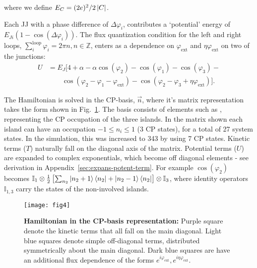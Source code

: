 \noindent where we define $ E_{C}={(2e)^{2}}/{2 \left|C\right| } $.

Each  JJ  with   a  phase  difference  of  $\Delta\varphi_{i}$,  contributes   a  `potential'  energy  of
$ E_{Ji}\left(1 - \cos(\Delta\varphi_i)\right) $.  The flux quantization condition for the left and right
loops,  $  \sum_{i}^{\text{loop}} \varphi_i  =  2\pi  n,  n \in  \mathbb{Z}$,  enters  as a  dependence  on
$ \varphi_\text{ext} $ and $ \eta\varphi_\text{ext} $ on two of the junctions:
\begin{equation}\label{eq:potential}
  \begin{aligned}
    U & = E_J\big[4 + \alpha - \alpha\cos(\varphi_{2}) -\cos(\varphi_{1}) -\cos(\varphi_{3}) - \\
    & \qquad \cos(\varphi_{2} - \varphi_{1} - \varphi_{\text{ext}}) - \cos(\varphi_{2} - \varphi_{3} + \eta\varphi_{\text{ext}})\big].
  \end{aligned}
\end{equation}

The Hamiltonian is solved in the CP-basis,  $\vec{n} $, where it's matrix representation takes
the form shown  in Fig.~\ref{fig:matrix_representation}.  The basis consists  of elements such
as , representing the CP occupation  of the three islands.  In the matrix shown
each island can have an  occupation $ -1 \le n_{i} \le 1$ (3 CP states),  for a total of 27 system
states. In  the simulation, this  was increased to  343 by using  7 CP states.   Kinetic terms
($ {T}  $) naturally fall on  the diagonal axis  of the matrix.   Potential terms ($ U  $) are
expanded  to complex  exponentials, which  become off  diagonal elements  - see  derivation in
Appendix~\ref{sec:expans-potent-term}.     For    example     $    \cos(\varphi_{2})    $    becomes
$    \mathbb{I}_{1}\otimes\frac{1}{2}\left[\sum_{n_2}\ket{n_2+1}\bra{n_2}     +    \ket{n_2-1}\bra{n_2}
\right]\otimes\mathbb{I}_{3} $,  where identity operators $  \mathbb{I}_{1,3} $ carry the  states of
the non-involved islands.

\begin{figure}[ht]
  \centering \texttt{[image: fig4]}
  \caption{\small \textbf{Hamiltonian in the CP-basis representation:} Purple square denote the kinetic terms that all fall on the main diagonal. Light blue squares denote simple off-diagonal terms, distributed symmetrically about the main diagonal. Dark blue squares are have an additional flux dependence of the forms $e^{i\varphi_{\text{ext}}}, e^{i\eta\varphi_{\text{ext}}}$.
    \label{fig:matrix_representation} }
\end{figure}

